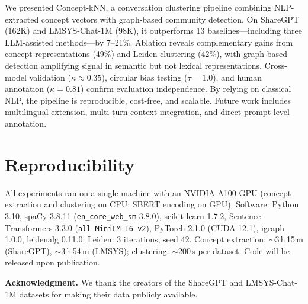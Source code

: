 \documentclass[conference]{IEEEtran}
\begin{document}
We presented Concept-kNN, a conversation clustering pipeline combining NLP-extracted concept vectors with graph-based community detection. On ShareGPT (162K) and LMSYS-Chat-1M (98K), it outperforms 13 baselines---including three LLM-assisted methods---by 7--21\%. Ablation reveals complementary gains from concept representations (49\%) and Leiden clustering (42\%), with graph-based detection amplifying signal in semantic but not lexical representations. Cross-model validation ($\kappa \approx 0.35$), circular bias testing ($\tau = 1.0$), and human annotation ($\kappa = 0.81$) confirm evaluation independence. By relying on classical NLP, the pipeline is reproducible, cost-free, and scalable. Future work includes multilingual extension, multi-turn context integration, and direct prompt-level annotation.

\section*{Reproducibility}

All experiments ran on a single machine with an NVIDIA A100 GPU (concept extraction and clustering on CPU; SBERT encoding on GPU). Software: Python 3.10, spaCy 3.8.11 (\texttt{en\_core\_web\_sm} 3.8.0), scikit-learn 1.7.2, Sentence-Transformers 3.3.0 (\texttt{all-MiniLM-L6-v2}), PyTorch 2.1.0 (CUDA 12.1), igraph 1.0.0, leidenalg 0.11.0. Leiden: 3 iterations, seed 42. Concept extraction: $\sim$3\,h\,15\,m (ShareGPT), $\sim$3\,h\,54\,m (LMSYS); clustering: $\sim$200\,s per dataset. Code will be released upon publication.

\noindent\textbf{Acknowledgment.} We thank the creators of the ShareGPT and LMSYS-Chat-1M datasets for making their data publicly available.
\end{document}
